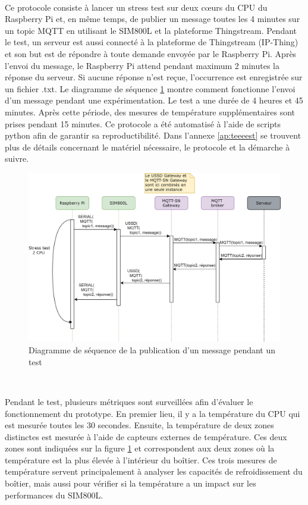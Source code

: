 ~

\noindent
Ce protocole consiste à lancer un stress test sur deux cœurs du CPU du Raspberry Pi et, en même temps, de publier un message toutes les 4 minutes sur un topic MQTT en utilisant le SIM800L et la plateforme Thingstream. Pendant le test, un serveur est aussi connecté à la plateforme de Thingstream (IP-Thing) et son but est de répondre à toute demande envoyée par le Raspberry Pi. Après l'envoi du message, le Raspberry Pi attend pendant maximum 2 minutes la réponse du serveur. Si aucune réponse n'est reçue, l'occurrence est enregistrée sur un fichier .txt. Le diagramme de séquence \ref{fig:dia_test} montre comment fonctionne l'envoi d'un message pendant une expérimentation. Le test a une durée de 4 heures et 45 minutes. Après cette période, des mesures de température supplémentaires sont prises pendant 15 minutes. Ce protocole a été automatisé à l'aide de scripts python afin de garantir sa reproductibilité. Dans l'annexe \ref{ap:teeeest} se trouvent plus de détails concernant le matériel nécessaire, le protocole et la démarche à suivre.

\begin{figure}[ht!]
  \includegraphics[width=\textwidth]{img/el_prototype/diagram_test.png}
  \caption{Diagramme de séquence de la publication d'un message pendant un test}
  \label{fig:dia_test}
\end{figure}


~

\vspace{-0.5cm}

\noindent
Pendant le test, plusieurs métriques sont surveillées afin d'évaluer le fonctionnement du prototype. En premier lieu, il y a la température du CPU qui est mesurée toutes les 30 secondes. Ensuite, la température de deux zones distinctes est mesurée à l'aide de capteurs externes de température. Ces deux zones sont indiquées sur la figure \ref{fig:dia_test} et correspondent aux deux zones où la température est la plus élevée à l'intérieur du boîtier. Ces trois mesures de température servent principalement à analyser les capacités de refroidissement du boîtier, mais aussi pour vérifier si la température a un impact sur les performances du SIM800L.

